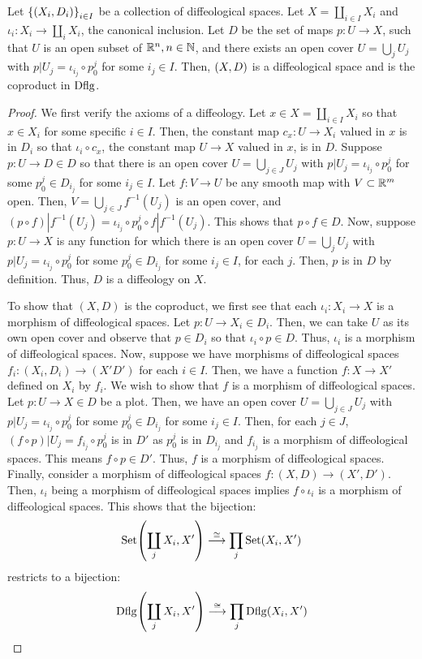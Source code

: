 \documentclass[11pt]{amsart}
\begin{document}
\begin{prop}\label{prop:coprod-dflg}
Let $\set{(X_i, D_i)}_{i \in I}$ be a collection of diffeological spaces.
Let $X = \coprod_{i \in I} X_i$ and $\iota_i : X_i \to \coprod_i X_i$, the canonical inclusion.
Let $D$ be the set of maps $p : U \to X$, such that $U$ is an open subset of $\mathbb{R}^n, n \in \mathbb{N}$,
and there exists an open cover $U = \bigcup_j U_j$ with $p|U_j = \iota_{i_j} \circ p^j_0$
for some $i_j \in I$.
Then, $\br{X, D}$ is a diffeological space and is the coproduct in $\mathrm{Dflg}$.
\end{prop}
\begin{proof}
We first verify the axioms of a diffeology.
Let $x \in X = \coprod_{i \in I} X_i$ so that $x \in X_i$ for some specific $i \in I$.
Then, the constant map $c_x : U \to X_i$ valued in $x$ is in $D_i$ so that
$\iota_i \circ c_x$, the constant map $U \to X$ valued in $x$, is in $D$.
Suppose $p : U \to D \in D$ so that there is an open cover $U = \bigcup_{j \in J} U_j$ with
$p|U_{j} = \iota_{i_j} \circ p^j_0$ for some $p^j_0 \in D_{i_j}$ for some $i_j \in I$.
Let $f : V \to U$ be any smooth map with $V \subset \mathbb{R}^m$ open.
Then, $V = \bigcup_{j \in J} f^{-1}(U_j)$ is an open cover, and
$(p \circ f)|f^{-1}(U_j) = \iota_{i_j} \circ p^j_0 \circ f|f^{-1}(U_j)$.
This shows that $p \circ f \in D$.
Now, suppose $p : U \to X$ is any function
for which there is an open cover $U = \bigcup_j U_j$ with $p|U_j = \iota_{i_j} \circ p^j_0$
for some $p^j_0 \in D_{i_j}$ for some $i_j \in I$, for each $j$. Then, $p$ is in $D$
by definition. Thus, $D$ is a diffeology on $X$.

To show that $(X, D)$ is the coproduct, we first see that each $\iota_{i} : X_i \to X$
is a morphism of diffeological spaces. Let $p : U \to X_i \in D_i$. Then, we can take $U$ as
its own open cover and observe that $p \in D_i$ so that $\iota_i \circ p \in D$.
Thus, $\iota_i$ is a morphism of diffeological spaces.
Now, suppose we have morphisms of diffeological spaces
$f_i : (X_i, D_i) \to (X' D')$ for each $i \in I$. Then, we have a function
$f : X \to X'$ defined on $X_i$ by $f_i$. We wish to show that $f$ is a morphism
of diffeological spaces. Let $p : U \to X \in D$ be a plot. Then, we have an open
cover $U = \bigcup_{j \in J} U_j$ with $p|U_j = \iota_{i_j} \circ p^j_0$ for some
$p^j_0 \in D_{i_j}$ for some $i_j \in I$. Then, for each $j \in J$,
$(f \circ p)|U_j = f_{i_j} \circ p^j_0$ is in $D'$ as $p^j_0$ is in $D_{i_j}$ and $f_{i_j}$ is a
morphism of diffeological spaces. This means $f \circ p \in D'$. Thus, $f$ is a morphism
of diffeological spaces.
Finally, consider a morphism of diffeological spaces $f : (X, D) \to (X', D')$.
Then, $\iota_i$ being a morphism of diffeological spaces implies $f \circ \iota_i$
is a morphism of diffeological spaces. This shows that the bijection:
\[
\Set\br{\coprod_j X_i, X'} \to[\cong] \prod_j \Set\br{X_i, X'}
\]
restricts to a bijection:
\[
\Dflg\br{\coprod_j X_i, X'} \to[\cong] \prod_j \Dflg\br{X_i, X'}
\]
\end{proof}
\end{document}
